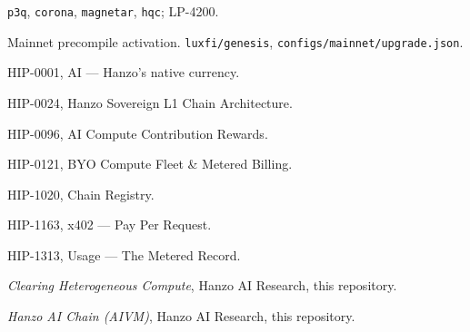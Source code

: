 \documentclass[11pt,a4paper]{article}
\theoremstyle{definition}
\theoremstyle{remark}
\newcommand{\code}[1]{\texttt{#1}}
\begin{document}
\begin{enumerate}[label={[\arabic*]},leftmargin=2.6em]
\code{p3q}, \code{corona}, \code{magnetar}, \code{hqc}; LP-4200.
\item Mainnet precompile activation. \code{luxfi/genesis},
\code{configs/mainnet/upgrade.json}.
\item HIP-0001, AI --- Hanzo's native currency.
\item HIP-0024, Hanzo Sovereign L1 Chain Architecture.
\item HIP-0096, AI Compute Contribution Rewards.
\item HIP-0121, BYO Compute Fleet \& Metered Billing.
\item HIP-1020, Chain Registry.
\item HIP-1163, x402 --- Pay Per Request.
\item HIP-1313, Usage --- The Metered Record.
\item \emph{Clearing Heterogeneous Compute}, Hanzo AI Research, this repository.
\item \emph{Hanzo AI Chain (AIVM)}, Hanzo AI Research, this repository.
\end{enumerate}
\end{document}

